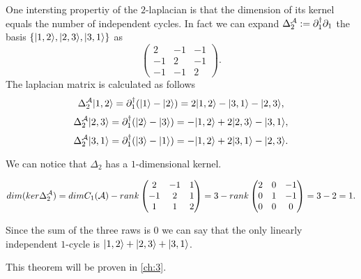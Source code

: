 \documentclass[../2.tex]{subfiles}
\begin{document}
    One intersting propertiy of the $2$-laplacian is that the dimension of its kernel equals the number of independent cycles.
    In fact we can expand $\Delta_2^{\mathcal{A}} := \partial_1^\dagger\partial_1$ the basis $\{| 1,2 \rangle,| 2,3 \rangle,| 3,1 \rangle\}$ as
    \[\begin{pmatrix}
        2 & -1 & -1  \\
        -1 & 2 & -1  \\
        -1& -1 & 2 
    \end{pmatrix}.\] 
    The laplacian matrix is calculated as follows
    \[\Delta_2^{\mathcal{A}}| 1,2 \rangle = \partial_1^\dagger(| 1 \rangle-| 2 \rangle) = 2| 1,2 \rangle-| 3,1 \rangle-| 2,3 \rangle,\]
    \[\Delta_2^{\mathcal{A}}| 2,3 \rangle = \partial_1^\dagger(| 2 \rangle-| 3 \rangle) = -| 1,2 \rangle+2| 2,3 \rangle-| 3,1 \rangle,\]
    \[\Delta_2^{\mathcal{A}}| 3,1 \rangle = \partial_1^\dagger(| 3 \rangle-| 1 \rangle) = -| 1,2 \rangle+2| 3,1 \rangle-| 2,3 \rangle.\]

    We can notice that $\Delta_2$ has a $1$-dimensional kernel.

    \[ dim(ker\Delta_2^{\mathcal{A}}) = dimC_1(\mathcal{A}) - rank
        \begin{pmatrix}
            2 & -1 & 1  \\
            -1 & 2 & 1  \\
            1& 1 & 2 
        \end{pmatrix} = 3 - rank
        \begin{pmatrix}
            2 & 0 & -1  \\
            0 & 1 & -1  \\
            0 & 0 & 0 
        \end{pmatrix} = 3 - 2 =  1. \]

    Since the sum of the three raws is $0$ we can say that the only linearly independent $1$-cycle is $| 1,2 \rangle+| 2,3 \rangle+| 3,1 \rangle$.

    This theorem will be proven in \autoref{ch:3}.
\end{document}

